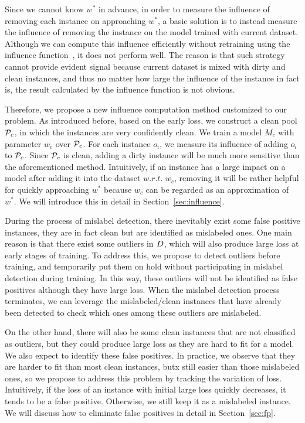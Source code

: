 Since we cannot know  $w^*$ in advance, in order to measure the influence of removing each instance on approaching  $w^*$, a basic solution is to instead measure the influence of removing the instance on the model trained with current dataset. Although we can compute this influence efficiently without retraining using the influence function~\cite{}, it does not perform well. The reason is that  such strategy cannot provide evident signal because current dataset is mixed with dirty and clean instances, and thus no matter how large the influence of the instance in fact is, the  result  calculated by the influence function is not obvious.

Therefore, we propose a new influence computation method customized to our problem. As introduced before, based on the early loss,  we construct a clean pool $\mathcal{P}_c$, in which the instances are very confidently clean. We train a model $M_c$ with parameter $w_c$ over $\mathcal{P}_c$. For each instance $o_i$, we measure its influence of adding $o_i$ to $\mathcal{P}_c$. Since $\mathcal{P}_c$ is clean, adding a dirty instance will be much more sensitive than the aforementioned method.
Intuitively, if an instance has a large impact on a model after adding it into the dataset  $w.r.t.$  $w_c$, removing it will be rather helpful  for   quickly  approaching $w^*$ because $w_c$ can be regarded as an approximation of $w^*$. We will introduce this in detail in Section~\ref{sec:influence}.




 During the process of mislabel detection, there inevitably exist some false positive instances, \ie  they are in fact clean but are identified as mislabeled ones. One main reason is that there exist some outliers in $D$, which will also produce large loss at early stages of training. To address this, we propose to detect outliers before training, and temporarily put them on hold without participating in mislabel detection during training. In this way, these outliers will not be identified as false positives although they have large loss. When the mislabel detection process terminates, we can leverage the mislabeled/clean instances that have already been detected to check which ones among these outliers are mislabeled.

On the other hand, there will also be some clean instances that are not classified as outliers, but they could produce large loss as they are hard to fit for a model. We also expect to identify these false positives. In practice, we observe that  they are harder to fit than most clean instances, butx still easier  than those mislabeled ones, so we propose to address this problem by tracking the variation of loss. Intuitively, if the loss  of an instance with initial large loss quickly decreases, it tends to be a false positive. Otherwise, we still keep it as a mislabeled instance. We will discuss how to eliminate false positives in detail in Section~\ref{sec:fp}.

